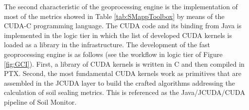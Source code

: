 \documentclass[APA,LATO1COL,doublespace]{WileyNJD-v2}
\newcommand{\toberevised}[1]{\emph{\textcolor{red}{#1}}} %
\begin{document}
The second characteristic of the geoprocessing engine is the implementation of most of the metrics showed in Table \ref{tab:SMappToolbox} by means of the CUDA-C programming language.
The CUDA code and its binding from Java is implemented in the logic tier in which %
the list of developed CUDA kernels is loaded as a library in the infrastructure.
The development of the fast geoprocessing engine is as follows (see the workflow in logic tier of Figure \ref{fig:GCI}).
First, a library of CUDA kernels is written in C and then compiled in PTX. 
Second, the most fundamental CUDA kernels work as primitives that are assembled in the JCUDA layer to build the crafted algorithms  addressing the calculation of soil sealing metrics.
This is referenced as the Java/JCUDA/CUDA pipeline of Soil Monitor.%
\end{document}
